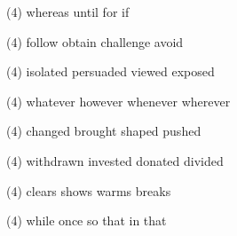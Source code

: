 \begin{tasks}(4)
	\task whereas
	\task until
	\task for
	\task if
\end{tasks}
\item
\begin{tasks}(4)
	\task follow
	\task obtain
	\task challenge
	\task avoid
\end{tasks}
\item
\begin{tasks}(4)
	\task isolated
	\task persuaded
	\task viewed
	\task exposed
\end{tasks}
\item
\begin{tasks}(4)
	\task whatever
	\task however
	\task whenever
	\task wherever
\end{tasks}
\item
\begin{tasks}(4)
	\task changed
	\task brought
	\task shaped
	\task pushed
\end{tasks}
\item
\begin{tasks}(4)
	\task withdrawn
	\task invested
	\task donated
	\task divided
\end{tasks}
\item
\begin{tasks}(4)
	\task clears
	\task shows
	\task warms
	\task breaks
\end{tasks}
\item
\begin{tasks}(4)
	\task while
	\task once
	\task so that
	\task in that
\end{tasks}